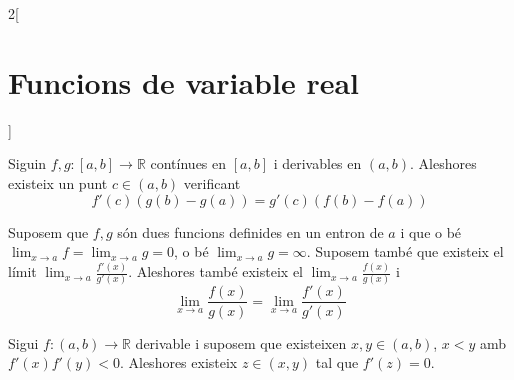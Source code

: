 \documentclass[../../../main.tex]{subfiles}
\begin{document}
\begin{multicols}{2}[\section{Funcions de variable real}]
\begin{corollary}
\end{corollary}
\begin{theorem}
Siguin $f,g:[a,b]\rightarrow\mathbb{R}$ contínues en $[a,b]$ i derivables en $(a,b)$. Aleshores existeix un punt $c\in (a,b)$ verificant $$f'(c)(g(b)-g(a))=g'(c)(f(b)-f(a))$$
\end{theorem}
\begin{theorem}
Suposem que $f,g$ són dues funcions definides en un entron de $a$ i que o bé $\lim_{x\to a} f=\lim_{x\to a} g=0$, o bé $\lim_{x\to a} g=\infty$. Suposem també que existeix el límit $\lim_{x\to a} \frac{f'(x)}{g'(x)}$. Aleshores també existeix el $\lim_{x\to a} \frac{f(x)}{g(x)}$ i $$\lim_{x\to a} \frac{f(x)}{g(x)}=\lim_{x\to a} \frac{f'(x)}{g'(x)}$$
\end{theorem}
\begin{theorem}
Sigui $f:(a,b)\rightarrow\mathbb{R}$ derivable i suposem que existeixen $x,y\in (a,b)$, $x<y$ amb $f'(x)f'(y)<0$. Aleshores existeix $z\in(x,y)$ tal que $f'(z)=0$. 
\end{theorem}

\end{multicols}
\end{document}
